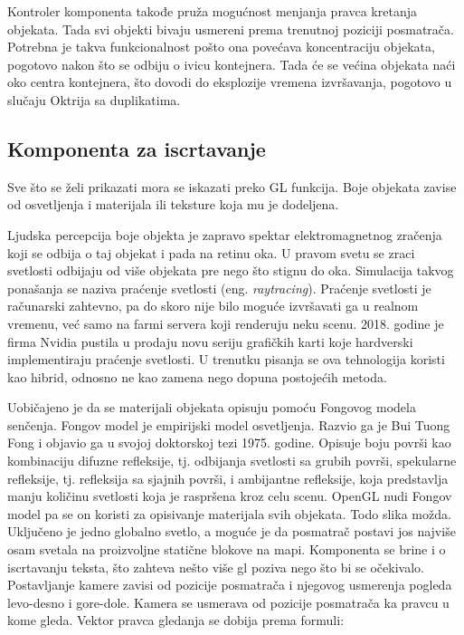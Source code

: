 \documentclass[12pt,oneside]{memoir}
\begin{document}
Kontroler komponenta takođe pruža mogućnost menjanja pravca kretanja objekata. 
Tada svi objekti bivaju usmereni prema trenutnoj poziciji posmatrača. 
Potrebna je takva funkcionalnost pošto ona povećava koncentraciju objekata, 
pogotovo nakon što se odbiju o ivicu kontejnera. Tada će se većina objekata 
naći oko centra kontejnera, što dovodi do eksplozije vremena izvršavanja, pogotovo u slučaju Oktrija sa duplikatima.

\subsection{Komponenta za iscrtavanje}

Sve što se želi prikazati mora se iskazati preko GL funkcija. 
Boje objekata zavise od osvetljenja i materijala ili teksture koja mu je dodeljena.

Ljudska percepcija boje objekta je zapravo spektar elektromagnetnog zračenja koji se odbija o taj objekat i pada na retinu oka.
U pravom svetu se zraci svetlosti odbijaju od više objekata pre nego što stignu do oka. 
Simulacija takvog ponašanja se naziva praćenje svetlosti (eng. {\em raytracing}).  
Praćenje svetlosti je računarski zahtevno, pa do skoro nije bilo moguće izvršavati ga u realnom vremenu, već samo na farmi servera koji renderuju neku scenu.
2018. godine je firma Nvidia pustila u prodaju novu seriju grafičkih karti koje hardverski implementiraju praćenje svetlosti. 
U trenutku pisanja se ova tehnologija koristi kao hibrid, odnosno ne kao zamena nego dopuna postojećih metoda.

Uobičajeno je da se materijali objekata opisuju pomoću Fongovog modela senčenja. 
Fongov model je empirijski model osvetljenja. Razvio ga je Bui Tuong Fong i objavio ga u svojoj doktorskoj tezi 1975. godine.
Opisuje boju površi kao kombinaciju difuzne refleksije, tj. odbijanja svetlosti sa grubih površi, 
spekularne refleksije, tj. refleksija sa sjajnih površi, i ambijantne refleksije, koja predstavlja manju količinu svetlosti 
koja je raspršena kroz celu scenu.
\cite{Phong} OpenGL nudi Fongov model pa se on koristi za opisivanje materijala svih objekata.
Todo slika možda.
Uključeno je jedno globalno svetlo, a moguće je da posmatrač postavi jos najviše osam svetala na 
proizvoljne statične blokove na mapi.
Komponenta se brine i o iscrtavanju teksta, što zahteva nešto više gl poziva nego što bi se očekivalo.
Postavljanje kamere zavisi od pozicije posmatrača i njegovog usmerenja pogleda levo-desno i gore-dole.
Kamera se usmerava od pozicije posmatrača ka pravcu u kome gleda.
Vektor pravca gledanja se dobija prema formuli:
\end{document}
